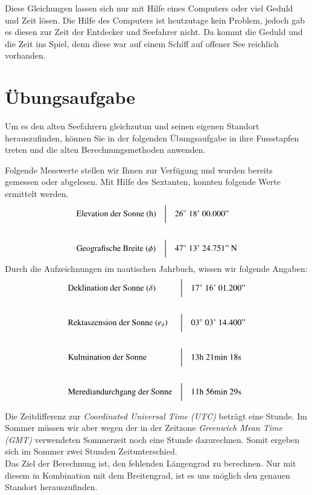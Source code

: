\begin{refsection}
Diese Gleichungen lassen sich nur mit Hilfe eines Computers oder viel Geduld und Zeit lösen. Die Hilfe des Computers ist heutzutage kein Problem, jedoch gab es diesen zur Zeit der Entdecker und Seefahrer nicht. Da kommt die Geduld und die Zeit ins Spiel, denn diese war auf einem Schiff auf offener See reichlich vorhanden.


\section{Übungsaufgabe}
Um es den alten Seefahrern gleichzutun und seinen eigenen Standort herauszufinden, können Sie in der folgenden Übungsaufgabe in ihre Fussstapfen treten und die alten Berechnungsmethoden anwenden.

Folgende Messwerte stellen wir Ihnen zur Verfügung und wurden bereits gemessen oder abgelesen.
Mit Hilfe des Sextanten, konnten folgende Werte ermittelt werden.
\[
\begin{aligned}
&\text{Elevation der Sonne (h)}
&
&\text{\bigg \vert}
&
&\text{$26^{\circ}$ 18’ 00.000’’}
\\
\\
&\text{Geografische Breite ($\phi$)}
&
&\text{\bigg \vert}
&
&\text{$47^{\circ}$ 13’ 24.751’’ N}
\end{aligned}
\]
Durch die Aufzeichnungen im nautischen Jahrbuch, wissen wir folgende Angaben:
\[
\begin{aligned}
&\text{Deklination der Sonne ($\delta$)}
&
&\text{\bigg \vert}
&
&\text{$17^{\circ}$ 16’ 01.200’’}
\\
\\
&\text{Rektaszension der Sonne ($e_\delta$)}
&
&\text{\bigg \vert}
&
&\text{$03^{\circ}$ 03’ 14.400’’}
\\
\\
&\text{Kulmination der Sonne}
&
&\text{\bigg \vert}
&
&\text{13h 21min 18s}
\\
\\
&\text{Merediandurchgang der Sonne}
&
&\text{\bigg \vert}
&
&\text{11h 56min 29s}
\end{aligned}
\]

Die Zeitdifferenz zur \textit{Coordinated Universal Time (UTC)} beträgt eine Stunde. Im Sommer müssen wir aber wegen der in der Zeitzone \textit{Greenwich Mean Time (GMT)} verwendeten Sommerzeit noch eine Stunde dazurechnen. Somit ergeben sich im Sommer zwei Stunden Zeitunterschied.\\ 


Das Ziel der Berechnung ist, den fehlenden Längengrad zu berechnen. Nur mit diesem in Kombination mit dem Breitengrad, ist es uns möglich den genauen Standort herauszufinden. \\


\end{refsection}
